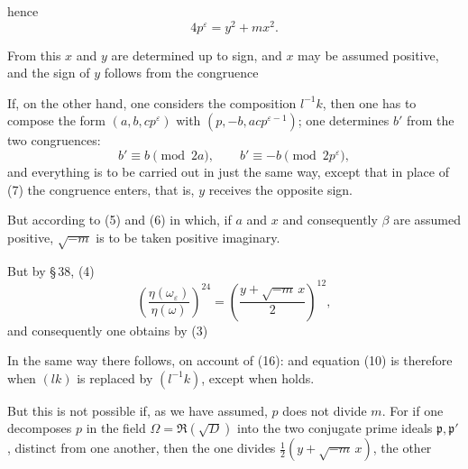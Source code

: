 hence
\[ 4 p^\varepsilon = y^2 + m x^2. \]

From this $x$ and $y$ are determined up to sign, and $x$ may be assumed positive, and the sign of $y$ follows from the congruence

If, on the other hand, one considers the composition $l^{-1} k$, then one has to compose the form $(a, b, c p^\varepsilon)$ with $(p, -b, a c p^{\varepsilon - 1})$; one determines $b'$ from the two congruences:
\[ b' \equiv b \pmod{2a}, \qquad b' \equiv -b \pmod{2 p^\varepsilon}, \]
and everything is to be carried out in just the same way, except that in place of (7) the congruence %
enters, that is, $y$ receives the opposite sign.

But according to (5) and (6)
in which, if $a$ and $x$ and consequently $\beta$ are assumed positive, $\sqrt{-m}$ is to be taken positive imaginary.

But by \S\,38, (4)
\[ \left( \frac{\eta(\omega_\varepsilon)}{\eta(\omega)} \right)^{24} = \left( \frac{y + \sqrt{-m}\, x}{2} \right)^{12}, \]
and consequently one obtains by (3)

In the same way there follows, on account of (16): %
and equation (10) is therefore  when $(lk)$ is replaced by $(l^{-1}k)$, except when
holds.

But this is not possible if, as we have assumed, $p$ does not divide $m$. For if one decomposes $p$ in the field $\Omega = \Re(\sqrt{D})$ into the two conjugate prime ideals $\mathfrak{p}, \mathfrak{p}'$, distinct from one another, then the one divides $\frac{1}{2}(y + \sqrt{-m}\, x)$, the other
